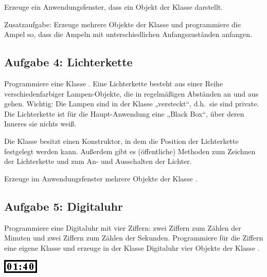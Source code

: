 \vspace{1mm}

Erzeuge ein Anwendungsfenster, dass ein Objekt der Klasse 
darstellt.

Zusatzaufgabe: Erzeuge mehrere Objekte der Klasse  und
programmiere die Ampel so, dass die Ampeln mit unterschiedlichen
Anfangszuständen anfangen.


\subsection{Aufgabe 4: Lichterkette}

Programmiere eine Klasse . Eine Lichterkette besteht aus
einer Reihe verschiedenfarbiger Lampen-Objekte, die in regelmäßigen Abständen an und aus gehen.
Wichtig: Die Lampen sind in der Klasse  „versteckt“, 
d.h.\ sie sind private. Die Lichterkette ist für die Haupt-Anwendung eine „Black
Box“, über deren Inneres sie nichts weiß.

Die Klasse  besitzt einen Konstruktor, in dem die Position
der Lichterkette festgelegt werden kann. Außerdem gibt es (öffentliche)
Methoden zum Zeichnen der Lichterkette und zum An- und Ausschalten der Lichter.

Erzeuge im Anwendungsfenster mehrere Objekte der Klasse .


\subsection{Aufgabe 5: Digitaluhr}

Programmiere eine Digitaluhr mit vier Ziffern: zwei Ziffern zum Zählen der
Minuten und zwei Ziffern zum Zählen der Sekunden. Programmiere für die Ziffern
eine eigene Klasse und erzeuge in der Klasse Digitaluhr vier Objekte der Klasse
.

\begin{minipage}{0.1\textwidth}
\begin{center}
\includegraphics[width=1.\textwidth]{./inf/SEKII/12_Java_Datenkapselung/digitaluhr.png}
\end{center}
\end{minipage}

